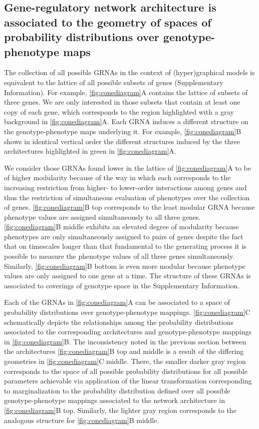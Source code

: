 \subsection{Gene-regulatory network architecture is associated to the geometry of spaces of probability distributions over genotype-phenotype maps}
The collection of all possible GRNAs in the context of (hyper)graphical models is equivalent to the lattice of all possible subsets of genes (Supplementary Information). For example, \ref{fig:conediagram}A contains the lattice of subsets of three genes. We are only interested in those subsets that contain at least one copy of each gene, which corresponds to the region highlighted with a gray background in \ref{fig:conediagram}A. Each GRNA induces a different structure on the genotype-phenotype maps underlying it. For example, \ref{fig:conediagram}B shows in identical vertical order the different structures induced by the three architectures highlighted in green in \ref{fig:conediagram}A.

We consider those GRNAs found lower in the lattice of \ref{fig:conediagram}A to be of higher modularity because of the way in which each corresponds to the increasing restriction from higher- to lower-order interactions among genes and thus the restriction of simultaneous evaluation of phenotypes over the collection of genes. \ref{fig:conediagram}B top corresponds to the least modular GRNA because phenotype values are assigned simultaneously to all three genes. \ref{fig:conediagram}B middle exhibits an elevated degree of modularity because phenotypes are only simultaneously assigned to pairs of genes despite the fact that on timescales longer than that fundamental to the generating process it is possible to measure the phenotype values of all three genes simultaneously. Similarly, \ref{fig:conediagram}B bottom is even more modular because phenotype values are only assigned to one gene at a time. The structure of these GRNAs is associated to coverings of genotype space in the Supplementary Information.

Each of the GRNAs in \ref{fig:conediagram}A can be associated to a space of probability distributions over genotype-phenotype mappings. \ref{fig:conediagram}C schematically depicts the relationships among the probability distributions associated to the corresponding architectures and genotype-phenotype mappings in \ref{fig:conediagram}B. The inconsistency noted in the previous section between the architectures \ref{fig:conediagram}B top and middle is a result of the differing geometries in \ref{fig:conediagram}C middle. There, the smaller darker gray region corresponds to the space of all possible probability distributions for all possible parameters achievable via application of the linear transformation corresponding to marginalization to the probability distribution defined over all possible genotype-phenotype mappings associated to the network architecture in \ref{fig:conediagram}B top. Similarly, the lighter gray region corresponds to the analogous structure for \ref{fig:conediagram}B middle.

